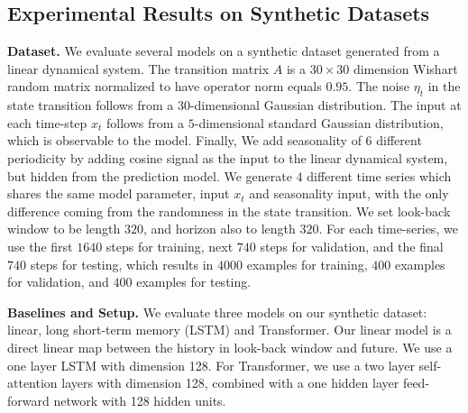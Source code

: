 \documentclass[10pt]{article} \usepackage[accepted]{tmlr}
\theoremstyle{plain}
\theoremstyle{definition}
\theoremstyle{remark}
\begin{document}
\subsection{Experimental Results on Synthetic Datasets}
\label{sec:sims}
{\bf Dataset.} We evaluate several models on a synthetic dataset generated from a linear dynamical system. The transition matrix $A$ is a $30\times 30$ dimension Wishart random matrix normalized to have operator norm equals $0.95$. The noise $\eta_t$ in the state transition follows from a $30$-dimensional Gaussian distribution. The input at each time-step $x_t$ follows from a $5$-dimensional standard Gaussian distribution, which is observable to the model. Finally, We add seasonality of $6$ different periodicity by adding cosine signal as the input to the linear dynamical system, but hidden from the prediction model. We generate $4$ different time series which shares the same model parameter, input $x_t$ and seasonality input, with the only difference coming from the randomness in the state transition. 
We set look-back window to be length $320$, and horizon also to length $320$. For each time-series, we use the first $1640$ steps for training, next $740$ steps for validation, and the final $740$ steps for testing, which results in $4000$ examples for training, $400$ examples for validation, and $400$ examples for testing. 

{\bf Baselines and Setup.}
We evaluate three models on our synthetic dataset: linear, long short-term memory (LSTM) and Transformer. Our linear model is a direct linear map between the history in look-back window and future. We use a one layer LSTM with dimension 128. For Transformer, we use a two layer self-attention layers with dimension 128, combined with a one hidden layer feed-forward network with 128 hidden units.
\end{document}
